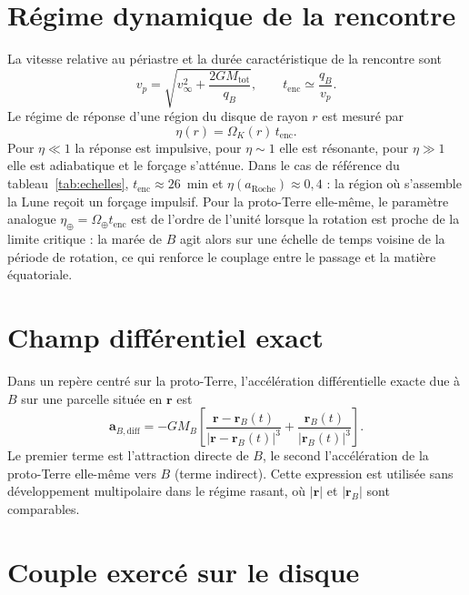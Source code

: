 \documentclass[11pt,a4paper,openany]{report}
\newcommand{\aR}{a_{\mathrm{Roche}}}
\newcommand{\Mtot}{M_{\mathrm{tot}}}
\begin{document}
\section{Régime dynamique de la rencontre}

La vitesse relative au périastre et la durée caractéristique de la rencontre sont
\begin{equation}
v_p=\sqrt{v_\infty^2+\frac{2G\Mtot}{q_B}},
\qquad
t_{\mathrm{enc}}\simeq\frac{q_B}{v_p}.
\label{eq:tenc}
\end{equation}
Le régime de réponse d'une région du disque de rayon $r$ est mesuré par
\begin{equation}
\eta(r)=\Omega_K(r)\,t_{\mathrm{enc}}.
\label{eq:eta}
\end{equation}
Pour $\eta\ll1$ la réponse est impulsive, pour $\eta\sim1$ elle est résonante, pour $\eta\gg1$
elle est adiabatique et le forçage s'atténue. Dans le cas de référence du
tableau~\ref{tab:echelles}, $t_{\mathrm{enc}}\approx26$~min et $\eta(\aR)\approx0{,}4$ : la région
où s'assemble la Lune reçoit un forçage impulsif. Pour la proto-Terre elle-même, le paramètre
analogue $\eta_\oplus=\Omega_\oplus t_{\mathrm{enc}}$ est de l'ordre de l'unité lorsque la rotation
est proche de la limite critique : la marée de $B$ agit alors sur une échelle de temps voisine de
la période de rotation, ce qui renforce le couplage entre le passage et la matière équatoriale.

\section{Champ différentiel exact}

Dans un repère centré sur la proto-Terre, l'accélération différentielle exacte due à $B$ sur une
parcelle située en $\mathbf{r}$ est
\begin{equation}
\mathbf{a}_{B,\mathrm{diff}}=-GM_B\left[
\frac{\mathbf{r}-\mathbf{r}_B(t)}{|\mathbf{r}-\mathbf{r}_B(t)|^3}
+\frac{\mathbf{r}_B(t)}{|\mathbf{r}_B(t)|^3}\right].
\label{eq:adiff}
\end{equation}
Le premier terme est l'attraction directe de $B$, le second l'accélération de la proto-Terre
elle-même vers $B$ (terme indirect). Cette expression est utilisée sans développement
multipolaire dans le régime rasant, où $|\mathbf{r}|$ et $|\mathbf{r}_B|$ sont comparables.

\section{Couple exercé sur le disque}
\end{document}
